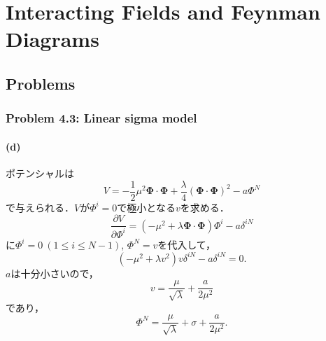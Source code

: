 \chapter{Interacting Fields and Feynman Diagrams}
\section*{Problems}
\subsection{Problem 4.3: Linear sigma model}
\subsubsection{(d)}
ポテンシャルは
\[ V = -\frac{1}{2} \mu^2 \boldsymbol\Phi \cdot \boldsymbol\Phi + \frac{\lambda}{4} (\boldsymbol\Phi \cdot \boldsymbol\Phi)^2 - a \Phi^N  \]
で与えられる．$V$が$\Phi^i = 0$で極小となる$v$を求める．
\[ \frac{\partial V}{\partial \Phi^i} = (-\mu^2 + \lambda \boldsymbol\Phi \cdot \boldsymbol\Phi) \Phi^i - a \delta^{iN} \]
に$\Phi^i = 0 ~ (1 \leq i \leq N-1)$, $\Phi^N = v$を代入して，
\[ (-\mu^2 + \lambda v^2) v \delta^{iN} - a \delta^{iN} = 0 .\]
$a$は十分小さいので，
\[ v = \frac{\mu}{\sqrt{\lambda}} + \frac{a}{2\mu^2} \]
であり，
\[ \Phi^N = \frac{\mu}{\sqrt{\lambda}} + \sigma + \frac{a}{2\mu^2} . \]

